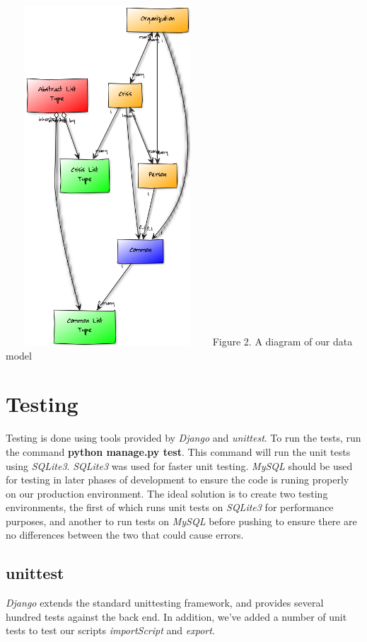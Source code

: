 \documentclass[12pt]{report}
\begin{document}
\hfill \newline \newline
\includegraphics*[width=3in,height=5in]{dataModelDiagram.png}
\newline
\footnotesize
Figure 2. A diagram of our data model %
\normalsize
\newpage

\newpage
\section*{Testing}
Testing is done using tools provided by \emph{Django} and \emph{unittest}.
To run the tests, run the command \textbf{python manage.py test}.
This command will run the unit tests using \emph{SQLite3}.
\emph{SQLite3} was used for faster unit testing.
\emph{MySQL} should be used for testing in later phases of development to ensure the code is runing properly on our production environment.
The ideal solution is to create two testing environments, the first of which runs unit tests on \emph{SQLite3} for performance purposes,
and another to run tests on \emph{MySQL} before pushing to ensure there are no differences between the two that could cause errors.

\subsection*{unittest}
\emph{Django} extends the standard unittesting framework, and provides several hundred tests against the back end.
In addition, we've added a number of unit tests to test our scripts \emph{importScript} and \emph{export}.
\end{document}
